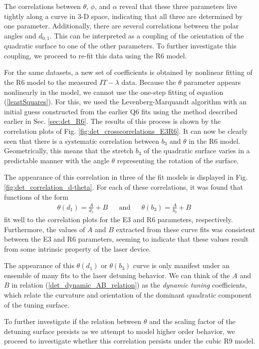 \documentclass[12pt]{report}
\begin{document}
	The correlations between $\theta$, $\phi$, and $\alpha$ reveal that these three parameters live tightly along a curve in 3-D space, indicating that all three are determined by one parameter. Additionally, there are several correlations between the polar angles and $d_{0,1}$. This can be interpreted as a coupling of the orientation of the quadratic surface to one of the other parameters. To further investigate this coupling, we proceed to re-fit this data using the R6 model.
	
	For the same datasets, a new set of coefficients is obtained by nonlinear fitting of the R6 model to the measured $IT-\lambda$ data. Because the $\theta$ parameter appears nonlinearly in the model, we cannot use the one-step fitting of equation (\ref{leastSquares}). For this, we used the Levenberg-Marquandt algorithm with an initial guess constructed from the earlier Q6 fits using the method described earlier in Sec. \ref{sec:det_R6}. The results of this process is shown by the correlation plots of Fig. \ref{fig:det_crosscorrelations_E3R6}. It can now be clearly seen that there is a systematic correlation between $b_3$ and $\theta$ in the R6 model. Geometrically, this means that the stretch $b_3$ of the quadratic surface varies in a predictable manner with the angle $\theta$ representing the rotation of the surface.
	
	The appearance of this correlation in three of the fit models is displayed in Fig. \ref{fig:det_correlation_d-theta}. For each of these correlations, it was found that functions of the form
	\begin{align} \label{det_dynamic_AB_relation}
		\theta(d_1) = \frac{A}{d_1} + B &&\text{and}&& \theta(b_3) = \frac{A}{b_3} + B &&
	\end{align}
	fit well to the correlation plots for the E3 and R6 parameters, respectively. Furthermore, the values of $A$ and $B$ extracted from these curve fits was consistent between the E3 and R6 parameters, seeming to indicate that these values result from some intrinsic property of the laser device.
	
	The appearance of this $\theta(d_1)$ or $\theta(b_3)$ curve is only manifest under an ensemble of many fits to the laser detuning behavior. We can think of the $A$ and $B$ in relation (\ref{det_dynamic_AB_relation}) as the \textit{dynamic tuning} coefficients, which relate the curvature and orientation of the dominant quadratic component of the tuning surface.
	
	To further investigate if the relation between $\theta$ and the scaling factor of the detuning surface persists as we attempt to model higher order behavior, we proceed to investigate whether this correlation persists under the cubic R9 model.
	
\end{document}
